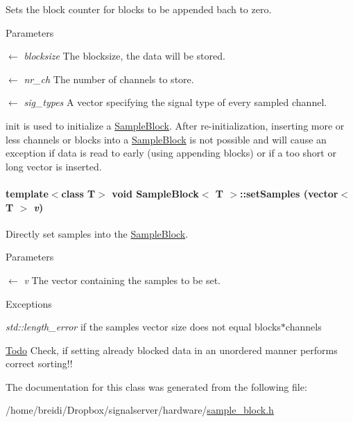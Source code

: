 Sets the block counter for blocks to be appended bach to zero. 
\begin{DoxyParams}{Parameters}
\item[\mbox{$\leftarrow$} {\em blocksize}]The blocksize, the data will be stored. \item[\mbox{$\leftarrow$} {\em nr\_\-ch}]The number of channels to store. \item[\mbox{$\leftarrow$} {\em sig\_\-types}]A vector specifying the signal type of every sampled channel.\end{DoxyParams}
init is used to initialize a \hyperlink{class_sample_block}{SampleBlock}. After re-\/initialization, inserting more or less channels or blocks into a \hyperlink{class_sample_block}{SampleBlock} is not possible and will cause an exception if data is read to early (using appending blocks) or if a too short or long vector is inserted. \hypertarget{class_sample_block_acb823540844a192e12069a065cc607e8}{
\paragraph[{setSamples}]{\setlength{\rightskip}{0pt plus 5cm}template$<$class T$>$ void {\bf SampleBlock}$<$ T $>$::setSamples (vector$<$ T $>$ {\em v})}\hfill}
\label{class_sample_block_acb823540844a192e12069a065cc607e8}


Directly set samples into the \hyperlink{class_sample_block}{SampleBlock}. 
\begin{DoxyParams}{Parameters}
\item[\mbox{$\leftarrow$} {\em v}]The vector containing the samples to be set. \end{DoxyParams}

\begin{DoxyExceptions}{Exceptions}
\item[{\em std::length\_\-error}]if the samples vector size does not equal blocks$\ast$channels \end{DoxyExceptions}
\begin{Desc}
\item[\hyperlink{todo__todo000012}{Todo}]Check, if setting already blocked data in an unordered manner performs correct sorting!! \end{Desc}


The documentation for this class was generated from the following file:\begin{DoxyCompactItemize}
\item 
/home/breidi/Dropbox/signalserver/hardware/\hyperlink{sample__block_8h}{sample\_\-block.h}\end{DoxyCompactItemize}
